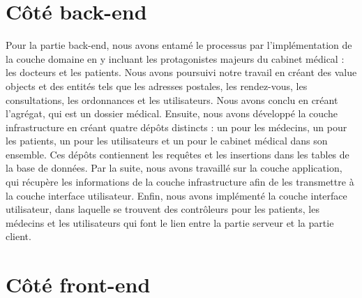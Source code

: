 \documentclass[a4paper]{report}
\begin{document}
\section{Côté back-end}

Pour la partie back-end, nous avons entamé le processus par l'implémentation de la couche domaine en y incluant les protagonistes majeurs 
du cabinet médical : les docteurs et les patients. Nous avons poursuivi notre travail en créant des value objects et des 
entités tels que les adresses postales, les rendez-vous, les consultations, les ordonnances et les utilisateurs. Nous avons conclu en créant l'agrégat, qui est un dossier médical. \newline\newline
Ensuite, nous avons développé la couche infrastructure en créant quatre dépôts distincts : un pour les médecins, un pour les 
patients, un pour les utilisateurs et un pour le cabinet médical dans son ensemble. Ces dépôts contiennent les requêtes et les 
insertions dans les tables de la base de données.\newline\newline
Par la suite, nous avons travaillé sur la couche application, qui récupère les informations de la couche infrastructure afin de les transmettre à la couche interface utilisateur. \newline\newline
Enfin, nous avons implémenté la couche interface utilisateur, dans laquelle se trouvent des contrôleurs pour les patients, les médecins et les utilisateurs qui font le lien entre la partie 
serveur et la partie client.\newline

\section{Côté front-end}
\end{document}
